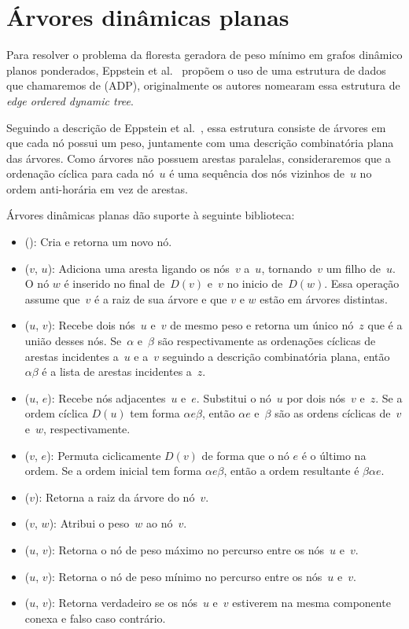 \section{Árvores dinâmicas planas}
\label{sec:EODT}

Para resolver o problema da floresta geradora de peso mínimo em grafos dinâmico planos ponderados, Eppstein et al.~\cite{EPPSTEIN-planar} propõem o uso de uma estrutura de dados que chamaremos de  (ADP), originalmente os autores nomearam essa estrutura de \textit{edge ordered dynamic tree}.

Seguindo a descrição de Eppstein et al.~\cite[Seção 3]{EPPSTEIN-planar}, essa estrutura consiste de árvores em que cada nó possui um peso, juntamente com uma descrição combinatória plana das árvores.
Como árvores não possuem arestas paralelas, consideraremos que a ordenação cíclica para cada nó~$u$ é uma sequência dos nós vizinhos de~$u$ no ordem anti-horária em vez de arestas.

Árvores dinâmicas planas dão suporte à seguinte biblioteca:
\begin{itemize}
\item \LCOMakeNode(): Cria e retorna um novo nó.
\item \LCOLink($v$, $u$): Adiciona uma aresta ligando os nós~$v$ a~$u$, tornando~$v$ um filho de~$u$.
O nó $w$ é inserido no final de~$D(v)$ e~$v$ no inicio de~$D(w)$.
Essa operação assume que~$v$ é a raiz de sua árvore e que $v$ e $w$ estão em árvores distintas.
\item \LCOMerge($u$, $v$): Recebe dois nós~$u$ e~$v$ de mesmo peso e retorna um único nó~$z$ que é a união desses nós.
Se~$\alpha$ e~$\beta$ são respectivamente as ordenações cíclicas de arestas incidentes a~$u$ e a~$v$ seguindo a descrição combinatória plana, então $\alpha\beta$ é a lista de arestas incidentes a~$z$.
\item \LCOSplit($u$, $e$): Recebe nós adjacentes~$u$ e~$e$.
Substitui o nó~$u$ por dois nós~$v$ e~$z$.
Se a ordem cíclica $D(u)$ tem forma $\alpha e\beta$, então $\alpha e$ e~$\beta$ são as ordens cíclicas de~$v$ e~$w$, respectivamente.
\item \LCOCycle($v$, $e$): Permuta ciclicamente $D(v)$ de forma que o nó $e$ é o último na ordem. Se a ordem inicial tem forma $\alpha e \beta$, então a ordem resultante é $\beta\alpha e$.
\item \LCORoot($v$): Retorna a raiz da árvore do nó~$v$.
\item \LCOAddCost($v$, $w$): Atribui o peso~$w$ ao nó~$v$.
\item \LCOMax($u$, $v$): Retorna o nó de peso máximo no percurso entre os nós~$u$ e~$v$.
\item \LCOMin($u$, $v$): Retorna o nó de peso mínimo no percurso entre os nós~$u$ e~$v$.
\item \LCOConnected($u$, $v$): Retorna verdadeiro se os nós~$u$ e~$v$ estiverem na mesma componente conexa e falso caso contrário.
\end{itemize}

